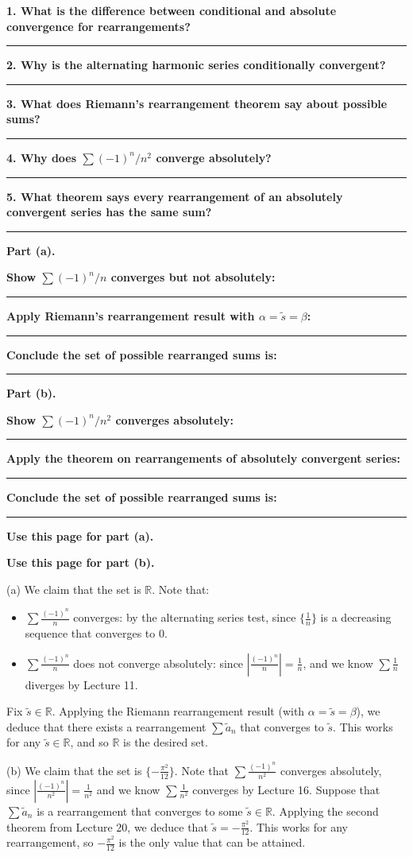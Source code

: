 \documentclass[12pt]{article}
\newcommand{\R}{\mathbb{R}}
\newcommand{\writespace}[1]{\vspace*{#1}}
\newcommand{\workquestion}[2]{%
  \par\noindent\textbf{#1}\par
  \writespace{#2}
  \noindent\rule{\linewidth}{0.35pt}\par\vspace{0.18in}%
}
\newenvironment{selfexplanationbox}[1]{%
  \begin{tcolorbox}[
    enhanced,
    colback=pass3orange,
    colframe=orange!65!black,
    fonttitle=\bfseries,
    title={Pass 3 -- Self-Explanation\hfill #1},
    height=8.45in
  ]
}{%
  \end{tcolorbox}
}
\newenvironment{skeletonbox}[1]{%
  \begin{tcolorbox}[
    enhanced,
    breakable,
    colback=pass4purple,
    colframe=purple!55!black,
    fonttitle=\bfseries,
    title={Pass 4 -- Skeleton Proof\hfill #1}
  ]
}{%
  \end{tcolorbox}
}
\newcommand{\fullproofpage}[2]{%
  \begin{tcolorbox}[
    enhanced,
    colback=white,
    colframe=gray!60!black,
    fonttitle=\bfseries,
    title={Pass 5 -- Full Proof Attempt\hfill #1},
    height=8.45in
  ]
  \textbf{#2}

  \writespace{7.65in}
  \end{tcolorbox}
}
\newenvironment{solutionbox}[1]{%
  \begin{tcolorbox}[
    enhanced,
    breakable,
    colback=solgreen,
    colframe=green!45!black,
    fonttitle=\bfseries,
    title={#1}
  ]
}{%
  \end{tcolorbox}
}
\begin{document}
\newpage
\begin{selfexplanationbox}{Homework 7, Problem 5}
\workquestion{1. What is the difference between conditional and absolute convergence for rearrangements?}{1.0in}
\workquestion{2. Why is the alternating harmonic series conditionally convergent?}{0.95in}
\workquestion{3. What does Riemann's rearrangement theorem say about possible sums?}{0.95in}
\workquestion{4. Why does \(\sum (-1)^n/n^2\) converge absolutely?}{0.9in}
\workquestion{5. What theorem says every rearrangement of an absolutely convergent series has the same sum?}{0.95in}
\end{selfexplanationbox}

\newpage
\begin{skeletonbox}{Homework 7, Problem 5}
\textbf{Part (a).}
\workquestion{Show \(\sum (-1)^n/n\) converges but not absolutely:}{1.0in}
\workquestion{Apply Riemann's rearrangement result with \(\alpha=\widetilde{s}=\beta\):}{0.95in}
\workquestion{Conclude the set of possible rearranged sums is:}{0.75in}

\textbf{Part (b).}
\workquestion{Show \(\sum (-1)^n/n^2\) converges absolutely:}{0.9in}
\workquestion{Apply the theorem on rearrangements of absolutely convergent series:}{0.95in}
\workquestion{Conclude the set of possible rearranged sums is:}{0.75in}
\end{skeletonbox}

\newpage
\fullproofpage{Homework 7, Problem 5}{Use this page for part (a).}

\newpage
\fullproofpage{Homework 7, Problem 5}{Use this page for part (b).}

\newpage
\begin{solutionbox}{Official Solution (Professor)}
(a) We claim that the set is \(\R\). Note that:
\begin{itemize}
  \item \(\sum \frac{(-1)^n}{n}\) converges: by the alternating series test, since \(\{\frac1n\}\) is a decreasing sequence that converges to \(0\).
  \item \(\sum \frac{(-1)^n}{n}\) does not converge absolutely: since \(\left|\frac{(-1)^n}{n}\right|=\frac1n\), and we know \(\sum\frac1n\) diverges by Lecture 11.
\end{itemize}
Fix \(\widetilde{s}\in\R\). Applying the Riemann rearrangement result (with \(\alpha=\widetilde{s}=\beta\)), we deduce that there exists a rearrangement \(\sum \widetilde{a}_n\) that converges to \(\widetilde{s}\). This works for any \(\widetilde{s}\in\R\), and so \(\R\) is the desired set.

(b) We claim that the set is \(\{-\frac{\pi^2}{12}\}\). Note that \(\sum\frac{(-1)^n}{n^2}\) converges absolutely, since \(\left|\frac{(-1)^n}{n^2}\right|=\frac1{n^2}\) and we know \(\sum\frac1{n^2}\) converges by Lecture 16. Suppose that \(\sum \widetilde{a}_n\) is a rearrangement that converges to some \(\widetilde{s}\in\R\). Applying the second theorem from Lecture 20, we deduce that \(\widetilde{s}=-\frac{\pi^2}{12}\). This works for any rearrangement, so \(-\frac{\pi^2}{12}\) is the only value that can be attained.
\end{solutionbox}
\end{document}
